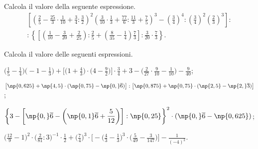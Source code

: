 \begin{esercizio}[\Ast]%
Calcola il valore della seguente espressione.
\begin{multline*}
\left[\left(\frac{2}{5}-\frac{25}{3}\cdot\frac{1}{10}+\frac{3}{4}:\frac{3}{2}\right)^2 \left(\frac{3}{10}\cdot\frac{1}{3}+\frac{77}{6}:\frac{11}{3}+\frac{7}{5}\right)^3-\left(\frac{3}{4}\right)^4:\left(\frac{3}{4}\right)^2\left(\frac{2}{3}\right)^3\right]:\\
:\left\lbrace\left[\left(\frac{1}{10}-\frac{3}{20}+\frac{2}{25}\right):\frac{2}{5}+\left(\frac{8}{35}-\frac{1}{4}\right)\frac{7}{3}\right]:\frac{3}{20}\cdot\frac{7}{3}\right\rbrace.
\end{multline*}
\end{esercizio}
\pagebreak
\begin{esercizio}[\Ast]%
 Calcola il valore delle seguenti espressioni.
\begin{enumeratea}
\spazielenx
\item $\displaystyle{\bigg(\frac{1}{5}-\frac{1}{4}\bigg)\bigg(-1-\frac{1}{3}\bigg)+\bigg[\bigg(1+\frac{4}{3}\bigg)\cdot
\bigg(4-\frac{9}{2}\bigg)\bigg]\cdot{\frac{3}{4}}+3-\bigg(\frac{2}{27}\cdot{\frac{9}{10}}-\frac{1}{10}\bigg)-\frac{9}{40}}$;
\item $\displaystyle{\left[\np{0,625}+\np{4,5}\cdot(\np{0,75}-\np{0,}\overline{6})\right]:\left[\np{0,875}+\np{0,75}\cdot(\np{2,5}-\np{2,}\overline{3})\right]}$;
\item $\displaystyle{\bigg\{3-\bigg[\np{0,}\overline{6}-\bigg(\np{0,1}\overline{6}+\frac{5}{12}\bigg)\bigg]:\np{0,25}\bigg\}^{2}\cdot
(\np{0,}\overline{6}-\np{0,625})}$;
\item $\displaystyle{\bigg(\frac{12}{9}-1\bigg)^{2}\cdot\bigg(\frac{2}{81}:3\bigg)^{-1}\cdot\frac{1}{2}+\bigg(\frac{7}{4}\bigg)^{3}\cdot
\bigg[-\bigg(\frac{4}{3}-\frac{1}{3}\bigg)^{3}\cdot\bigg(\frac{5}{49}-\frac{3}{147}\bigg)\bigg]-\frac{1}{(-4)^{2}}}$.
\end{enumeratea}
\end{esercizio}

